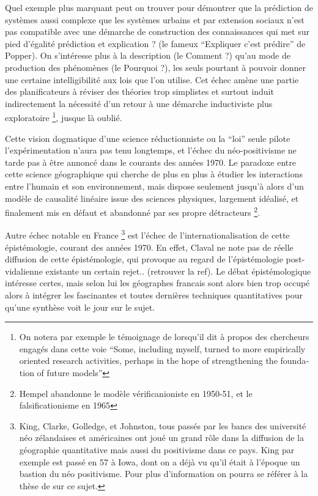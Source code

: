 {Quel exemple plus marquant peut on trouver pour démontrer que la prédiction de systèmes aussi complexe que les systèmes urbains et par extension sociaux n'est pas compatible avec une démarche de construction des connaissances qui met sur pied d'égalité prédiction et explication ? (le fameux \enquote{Expliquer c'est prédire} de Popper). On s’intéresse plus à la description (le Comment ?) qu'au mode de production des phénomènes (le Pourquoi ?), les seuls pourtant à pouvoir donner une certaine intelligibilité aux lois que l'on utilise. \autocite[14-15]{Besse2000} Cet échec amène une partie des planificateurs à réviser des théories trop simplistes et surtout induit indirectement la nécessité d'un retour à une démarche inductiviste plus exploratoire \footnote{On notera par exemple le témoignage de \autocite{Boyce1988} lorsqu'il dit à propos des chercheurs engagés dans cette voie \foreignquote{english}{Some, including myself, turned to more empirically oriented research activities, perhaps in the hope of strengthening the foundation of future models}}, jusque là oublié.

Cette vision dogmatique d'une science réductionniste ou la \enquote{loi} seule pilote l’expérimentation n'aura pas tenu longtemps, et l’échec du néo-positivisme \autocite[147]{Ouelbani2006} ne tarde pas à être annoncé dans le courants des années 1970. Le paradoxe entre cette science géographique qui cherche de plus en plus à étudier les interactions entre l'humain et son environnement, mais dispose seulement jusqu'à alors d'un modèle de causalité linéaire issue des sciences physiques, largement idéalisé, et finalement mis en défaut et abandonné par ses propre détracteurs  \footnote {Hempel abandonne le modèle vérificanioniste en 1950-51, et le falsificationisme en 1965}.

Autre échec notable en France \footnote{ King, Clarke, Golledge, et Johnston, tous passés par les bancs des université néo zélandaises et américaines ont joué un grand rôle dans la diffusion de la géographie quantitative mais aussi du positivisme dans ce pays. King par exemple est passé en 57 à Iowa, dont on a déjà vu qu'il était à l'époque un bastion du néo positivisme. Pour plus d'information on pourra se référer à la thèse de \textcite{Hammond1992} sur ce sujet.} est l'échec de l'internationalisation de cette épistémologie, courant des années 1970. En effet, Claval ne note pas de réelle diffusion de cette épistémologie, qui provoque au regard de l'épistémologie post-vidalienne existante un certain rejet.. (retrouver la ref). Le débat épistémologique intéresse certes, mais selon lui les géographes francais sont alors bien trop occupé alors à intégrer les fascinantes et toutes dernières techniques quantitatives pour qu'une synthèse voit le jour sur le sujet.\autocite[27-29]{Claval2003}

}

